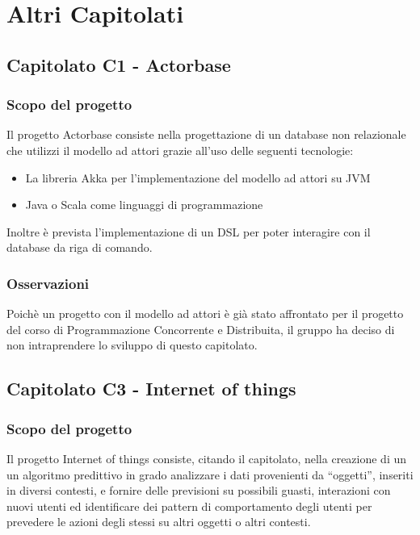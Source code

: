 \section{Altri Capitolati}

\subsection{Capitolato C1 - Actorbase}
\subsubsection{Scopo del progetto}

Il progetto Actorbase consiste nella progettazione di un database non relazionale che utilizzi il modello ad attori grazie all'uso delle seguenti tecnologie:
\begin{itemize}
	\item La libreria Akka per l'implementazione del modello ad attori su JVM
	\item Java o Scala come linguaggi di programmazione
\end{itemize}
Inoltre è prevista l'implementazione di un DSL per poter interagire con il database da riga di comando.

\subsubsection{Osservazioni}
Poichè un progetto con il modello ad attori è già stato affrontato per il progetto del corso di Programmazione Concorrente e Distribuita, il gruppo ha deciso di
non intraprendere lo sviluppo di questo capitolato.


\subsection{Capitolato C3 - Internet of things}
\subsubsection{Scopo del progetto}

Il progetto Internet of things consiste, citando il capitolato, nella creazione di un un algoritmo predittivo in grado analizzare i dati provenienti da “oggetti”, inseriti
in diversi contesti, e fornire delle previsioni su possibili guasti, interazioni con nuovi utenti ed identificare dei pattern di comportamento degli utenti per prevedere le azioni degli
stessi su altri oggetti o altri contesti.

